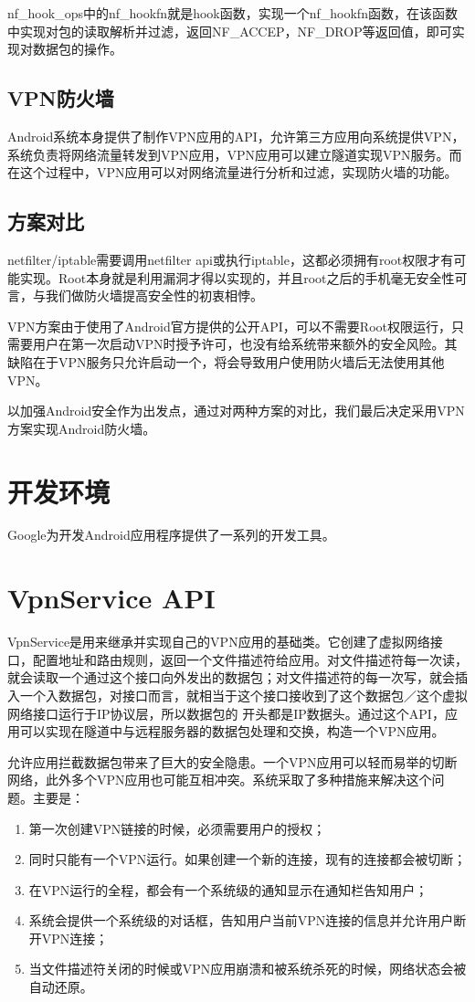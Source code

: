 \documentclass[format=final, language=chinese, degree=bachelor]{hustthesis}
\begin{document}
nf\_hook\_ops中的nf\_hookfn就是hook函数，实现一个nf\_hookfn函数，在该函数中实现对包的读取解析并过滤，返回NF\_ACCEP，NF\_DROP等返回值，即可实现对数据包的操作。

\subsection{VPN防火墙}

Android系统本身提供了制作VPN应用的API，允许第三方应用向系统提供VPN，系统负责将网络流量转发到VPN应用，VPN应用可以建立隧道实现VPN服务。而在这个过程中，VPN应用可以对网络流量进行分析和过滤，实现防火墙的功能。

\subsection{方案对比}
netfilter/iptable需要调用netfilter api或执行iptable，这都必须拥有root权限才有可能实现。Root本身就是利用漏洞才得以实现的，并且root之后的手机毫无安全性可言，与我们做防火墙提高安全性的初衷相悖。

VPN方案由于使用了Android官方提供的公开API，可以不需要Root权限运行，只需要用户在第一次启动VPN时授予许可，也没有给系统带来额外的安全风险。其缺陷在于VPN服务只允许启动一个，将会导致用户使用防火墙后无法使用其他VPN。

以加强Android安全作为出发点，通过对两种方案的对比，我们最后决定采用VPN方案实现Android防火墙。

\section{开发环境}

Google为开发Android应用程序提供了一系列的开发工具。

\section{VpnService API}

VpnService是用来继承并实现自己的VPN应用的基础类。它创建了虚拟网络接口，配置地址和路由规则，返回一个文件描述符给应用。对文件描述符每一次读，就会读取一个通过这个接口向外发出的数据包；对文件描述符的每一次写，就会插入一个入数据包，对接口而言，就相当于这个接口接收到了这个数据包／这个虚拟网络接口运行于IP协议层，所以数据包的 开头都是IP数据头。通过这个API，应用可以实现在隧道中与远程服务器的数据包处理和交换，构造一个VPN应用。

允许应用拦截数据包带来了巨大的安全隐患。一个VPN应用可以轻而易举的切断网络，此外多个VPN应用也可能互相冲突。系统采取了多种措施来解决这个问题。主要是：
\begin{enumerate}
 	\item 第一次创建VPN链接的时候，必须需要用户的授权；\label{item:1}
	\item 同时只能有一个VPN运行。如果创建一个新的连接，现有的连接都会被切断；
	\item 在VPN运行的全程，都会有一个系统级的通知显示在通知栏告知用户；
	\item 系统会提供一个系统级的对话框，告知用户当前VPN连接的信息并允许用户断开VPN连接；
	\item 当文件描述符关闭的时候或VPN应用崩溃和被系统杀死的时候，网络状态会被自动还原。
\end{enumerate}
\end{document}
